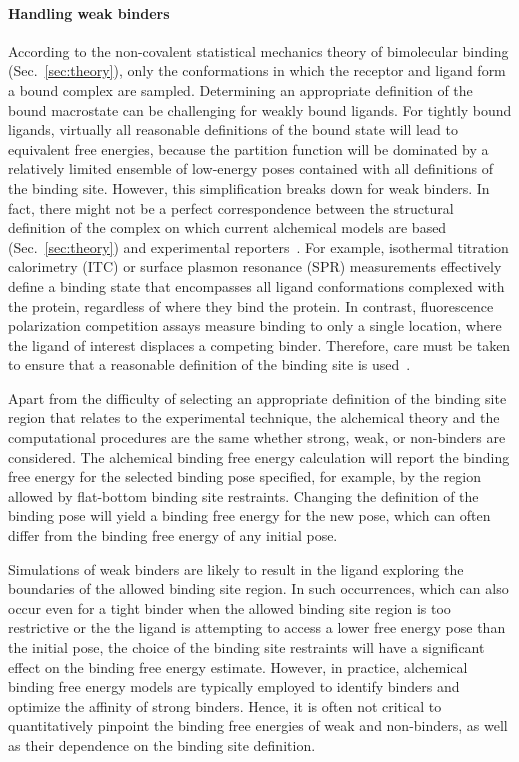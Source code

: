 \documentclass[9pt,bestpractices]{livecoms}
\begin{document}
\paragraph{Handling weak binders}\label{sec:weak-binders}
According to the non-covalent statistical mechanics theory of bimolecular binding (Sec.~\ref{sec:theory}), only the conformations in which the receptor and ligand form a bound complex are sampled. Determining an appropriate definition of the bound macrostate can be challenging for weakly bound ligands. For tightly bound ligands, virtually all reasonable definitions of the bound state will lead to equivalent free energies, because the partition function will be dominated by a relatively limited ensemble of low-energy poses contained with all definitions of the binding site. However, this simplification breaks down for weak binders.  In fact, there might not be a perfect correspondence between the structural definition of the complex on which current alchemical models are based~\cite{gilson1997statisticalthermodynamic} (Sec.~\ref{sec:theory}) and experimental reporters~\cite{mihailescu2004theory}. For example, isothermal titration calorimetry (ITC) or surface plasmon resonance (SPR) measurements effectively define a binding state that encompasses all ligand conformations complexed with the protein, regardless of where they bind the protein. In contrast, fluorescence polarization competition assays measure binding to only a single location, where the ligand of interest displaces a competing binder. Therefore, care must be taken to ensure that a reasonable definition of the binding site is used~\cite{wang2013identifying}.

Apart from the difficulty of selecting an appropriate definition of the binding site region that relates to the experimental technique, the alchemical theory and the computational procedures are the same whether strong, weak, or non-binders are considered. The alchemical binding free energy calculation will report the binding free energy for the selected binding pose specified, for example, by the region allowed by flat-bottom binding site restraints. Changing the definition of the binding pose will yield a binding free energy for the new pose, which can often differ from the binding free energy of any initial pose. 

Simulations of weak binders are likely to result in the ligand exploring the boundaries of the allowed binding site region. In such occurrences, which can also occur even for a tight binder when the allowed binding site region is too restrictive or the the ligand is attempting to access a lower free energy pose than the initial pose, the choice of the binding site restraints will have a significant effect on the binding free energy estimate. However, in practice, alchemical binding free energy models are typically employed to identify binders and optimize the affinity of strong binders. Hence, it is often not critical to quantitatively pinpoint the binding free energies of weak and non-binders, as well as their dependence on the binding site definition.
\end{document}
